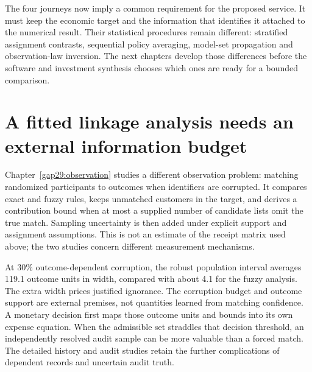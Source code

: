 The four journeys now imply a common requirement for the proposed service.
It must keep the economic target and the information that identifies it
attached to the numerical result. Their statistical procedures remain
different: stratified assignment contrasts, sequential policy averaging,
model-set propagation and observation-law inversion. The next chapters
develop those differences before the software and investment synthesis chooses
which ones are ready for a bounded comparison.

\section{A fitted linkage analysis needs an external information budget}
Chapter~\ref{gap29:observation} studies a different observation problem:
matching randomized participants to outcomes when identifiers are corrupted.
It compares exact and fuzzy rules, keeps unmatched customers in the target,
and derives a contribution bound when at most a supplied number of candidate
lists omit the true match. Sampling uncertainty is then added under explicit
support and assignment assumptions. This is not an estimate of the receipt
matrix used above; the two studies concern different measurement mechanisms.

At 30\% outcome-dependent corruption, the robust population interval averages
119.1 outcome units in width, compared with about 4.1 for the fuzzy analysis.
The extra width prices justified ignorance. The corruption budget and outcome
support are external premises, not quantities learned from matching confidence.
A monetary decision first maps those outcome units and bounds into its own
expense equation. When the admissible set straddles that decision threshold,
an independently resolved audit sample can be more valuable than a forced
match. The detailed history and audit studies retain the further complications
of dependent records and uncertain audit truth.
